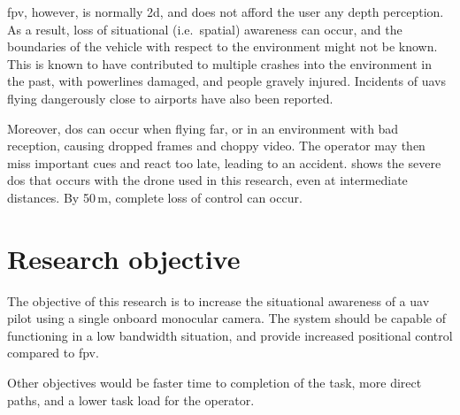 \gls{fpv}, however, is normally \gls{2d}, and does not afford the user any depth perception.
As a result, loss of situational (i.e.\ spatial) awareness can occur, and the boundaries of the vehicle with respect to the environment might not be known.
This is known to have contributed to multiple crashes into the environment in the past, with powerlines damaged,\cite{latimes2015} and people gravely injured.\cite{seattletimes2015,bbcnews2015}
Incidents of \glspl{uav} flying dangerously close to airports have also been reported.\cite{ctvnews2014}

Moreover, \gls{dos} can occur when flying far, or in an environment with bad reception, causing dropped frames and choppy video.
The operator may then miss important cues and react too late, leading to an accident.
 shows the severe \gls{dos} that occurs with the drone used in this research, even at intermediate distances. By 50\,m, complete loss of control can occur.

\section{Research objective}
The objective of this research is to increase the situational awareness of a \gls{uav} pilot using a single onboard monocular camera.
The system should be capable of functioning in a low bandwidth situation, and provide increased positional control compared to \gls{fpv}.

Other objectives would be faster time to completion of the task, more direct paths, and a lower task load for the operator.
